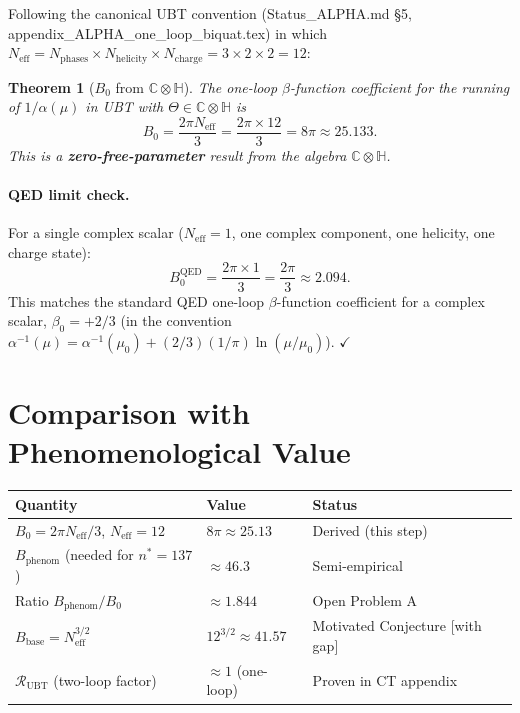\documentclass[12pt,a4paper]{article}
\newtheorem{theorem}{Theorem}[section]
\theoremstyle{definition}
\theoremstyle{remark}
\newcommand{\C}{\mathbb{C}}
\renewcommand{\H}{\mathbb{H}}
\newcommand{\Neff}{N_{\mathrm{eff}}}
\begin{document}
Following the canonical UBT convention (Status\_ALPHA.md §5,
appendix\_ALPHA\_one\_loop\_biquat.tex) in which
$\Neff = N_\mathrm{phases} \times N_\mathrm{helicity} \times N_\mathrm{charge}
= 3 \times 2 \times 2 = 12$:

\begin{theorem}[$B_0$ from $\C \otimes \H$]
\label{thm:B0}
The one-loop $\beta$-function coefficient for the running of $1/\alpha(\mu)$
in UBT with $\Theta \in \C \otimes \H$ is
\begin{equation}
  \boxed{B_0 = \frac{2\pi \Neff}{3} = \frac{2\pi \times 12}{3} = 8\pi \approx 25.133.}
  \label{eq:B0_final}
\end{equation}
This is a \textbf{zero-free-parameter} result from the algebra $\C \otimes \H$.
\end{theorem}

\paragraph{QED limit check.}
For a single complex scalar ($\Neff = 1$, one complex component,
one helicity, one charge state):
\begin{equation}
  B_0^{\mathrm{QED}} = \frac{2\pi \times 1}{3} = \frac{2\pi}{3} \approx 2.094.
  \label{eq:B0_QED}
\end{equation}
This matches the standard QED one-loop $\beta$-function coefficient for a
complex scalar, $\beta_0 = +2/3$ (in the convention $\alpha^{-1}(\mu)
= \alpha^{-1}(\mu_0) + (2/3)(1/\pi)\ln(\mu/\mu_0)$). $\checkmark$

\section{Comparison with Phenomenological Value}
\label{sec:comparison}

\begin{center}
\begin{tabular}{lll}
  \toprule
  \textbf{Quantity} & \textbf{Value} & \textbf{Status} \\
  \midrule
  $B_0 = 2\pi\Neff/3$, $\Neff = 12$ & $8\pi \approx 25.13$ & Derived (this step) \\
  $B_\mathrm{phenom}$ (needed for $n^* = 137$) & $\approx 46.3$ & Semi-empirical \\
  Ratio $B_\mathrm{phenom}/B_0$ & $\approx 1.844$ & Open Problem A \\
  \midrule
  $B_\mathrm{base} = \Neff^{3/2}$ & $12^{3/2} \approx 41.57$ & Motivated Conjecture [with gap] \\
  $\mathcal{R}_\mathrm{UBT}$ (two-loop factor) & $\approx 1$ (one-loop) & Proven in CT appendix \\
  \bottomrule
\end{tabular}
\end{center}
\end{document}
